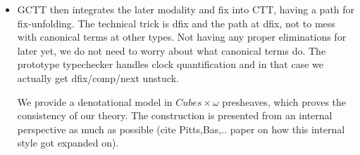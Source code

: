 \documentclass{book}
\begin{document}
\begin{itemize}
\begin{itemize}
   \item GCTT then integrates the later modality and fix into CTT, having a path for fix-unfolding.
     The technical trick is dfix and the path at dfix, not to mess with canonical terms at other types.
     Not having any proper eliminations for later yet, we do not need to worry about what canonical terms do.
     The prototype typechecker handles clock quantification and in that case we actually get dfix/comp/next unstuck.
     
     We provide a denotational model in $Cubes \times \omega$
     presheaves, which proves the consistency of our theory. The construction is presented from an internal
     perspective as much as possible (cite Pitts,Bas,.. paper on how this internal style got expanded on).
  \end{itemize}
\end{itemize}
\end{document}
